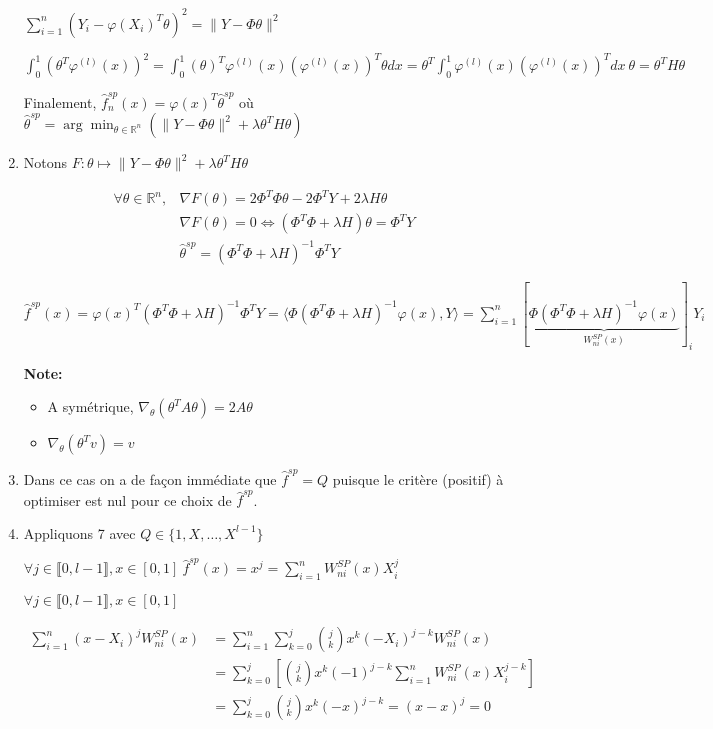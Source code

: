 \documentclass[10pt,a4paper,oneside]{article}
\newcommand{\argmin}{\arg\!\min}
\begin{document}
\begin{enumerate}
$\sum_{i = 1}^n (Y_i - \varphi(X_i)^T \theta)^2 = \| Y - \Phi \theta \|^2$

$\int_0^1 (\theta^T \varphi^{(l)}(x))^2 = \int_0 ^ 1(\theta)^T \varphi^{(l)}(x) (\varphi^{(l)}(x))^T \theta dx = \theta^T \int_0^1 \varphi^{(l)}(x) (\varphi^{(l)}(x))^T dx\ \theta = \theta^T H \theta$

Finalement, $\hat{f}^{sp}_n(x) = \varphi(x)^T \hat{\theta}^{sp}$ où $\hat{\theta}^{sp} = \argmin_{\theta \in \mathbb{R}^n} (\| Y - \Phi \theta \|^2 + \lambda \theta^T H \theta)$

\item
Notons $F : \theta \mapsto \| Y - \Phi \theta \|^2 + \lambda \theta^T H \theta$

\begin{align*}
\forall \theta \in \mathbb{R}^n, &\nabla F(\theta) = 2 \Phi^T \Phi \theta - 2 \Phi^T Y + 2 \lambda H \theta \\
& \nabla F(\theta) = 0 \Leftrightarrow (\Phi^T \Phi + \lambda H) \theta = \Phi^T Y \\
& \hat{\theta}^{sp} = (\Phi^T \Phi + \lambda H)^{-1} \Phi^T Y
\end{align*}

$\hat{f}^{sp}(x) = \varphi(x)^T (\Phi^T \Phi + \lambda H)^{-1} \Phi^T Y = \langle \Phi (\Phi^T \Phi + \lambda H)^{-1} \varphi(x), Y \rangle = \sum_{i = 1}^n [\underbrace{\Phi (\Phi^T \Phi + \lambda H)^{-1} \varphi(x)}_{W^{SP}_{ni}(x)}]_i Y_i$

\textbf{Note:}

\begin{itemize}
\item
A symétrique, $\nabla_\theta(\theta^T A \theta) = 2A \theta$
\item
$\nabla_\theta(\theta^T v) = v$
\end{itemize}

\item
Dans ce cas on a de façon immédiate que $\hat{f}^{sp} = Q$ puisque le critère (positif) à optimiser est nul pour ce choix de $\hat{f}^{sp}$.

\item
Appliquons 7 avec $Q \in \{ 1,X,\ldots,X^{l - 1} \}$

$\forall j \in \llbracket 0, l - 1 \rrbracket, x \in [0,1]\ \hat{f}^{sp}(x) = x^j = \sum_{i = 1}^n W^{SP}_{ni}(x) X_i^j$

$\forall j \in \llbracket 0, l - 1 \rrbracket, x \in [0,1]$

\begin{align*}
\sum_{i = 1}^n (x - X_i)^j W^{SP}_{ni}(x) &= \sum_{i = 1}^n \sum_{k = 0}^j \binom{j}{k} x^k (-X_i)^{j - k} W^{SP}_{ni}(x) \\
&= \sum_{k = 0}^j \left[ \binom{j}{k} x^k (-1)^{j - k} \sum_{i = 1}^n  W^{SP}_{ni}(x) X_i^{j - k} \right] \\
&= \sum_{k = 0}^j  \binom{j}{k} x^k (-x)^{j - k} = (x - x)^j = 0
\end{align*}
\end{enumerate}
\end{document}

